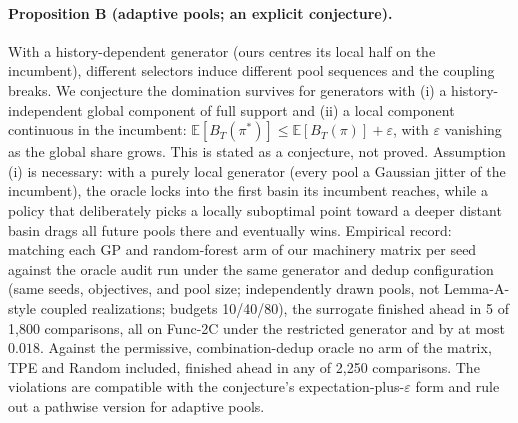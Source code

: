 \documentclass[%
 aip,
 amsmath,amssymb,
 floatfix,
 reprint,%
]{revtex4-1}
\begin{document}
\paragraph{Proposition B (adaptive pools; an explicit conjecture).}
With a history-dependent generator (ours centres its local half on the
incumbent), different selectors induce different pool sequences and the
coupling breaks. We conjecture the domination survives for generators
with (i) a history-independent global component of full support and
(ii) a local component continuous in the incumbent:
$\mathbb{E}[B_T(\pi^\ast)] \le \mathbb{E}[B_T(\pi)] + \varepsilon$, with
$\varepsilon$ vanishing as the global share grows. This is stated as a
conjecture, not proved. Assumption (i) is necessary: with a purely local
generator (every pool a Gaussian jitter of the incumbent), the oracle
locks into the first basin its incumbent reaches, while a policy that
deliberately picks a locally suboptimal point toward a deeper distant
basin drags all future pools there and eventually wins. Empirical
record: matching each GP and random-forest arm of our machinery matrix
per seed against the oracle audit run under the same generator and dedup
configuration (same seeds, objectives, and pool size; independently
drawn pools, not Lemma-A-style coupled realizations; budgets 10/40/80),
the surrogate finished ahead in 5 of 1{,}800 comparisons, all on Func-2C
under the restricted generator and by at most $0.018$. Against the
permissive, combination-dedup oracle no arm of the matrix, TPE and
Random included, finished ahead in any of 2{,}250 comparisons. The
violations are compatible with the conjecture's
expectation-plus-$\varepsilon$ form and rule out a pathwise version for
adaptive pools.
\end{document}
